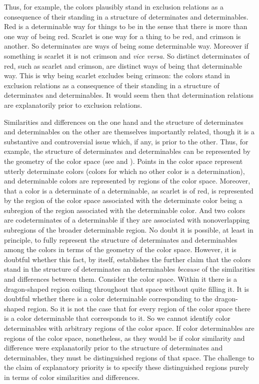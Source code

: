 \documentclass[12pt]{article}
\begin{document}
Thus, for example, the colors plausibly stand in exclusion relations as a consequence of their standing in a structure of determinates and determinables. Red is a determinable way for things to be in the sense that there is more than one way of being red. Scarlet is one way for a thing to be red, and crimson is another. So determinates are ways of being some determinable way. Moreover if something is scarlet it is not crimson and \emph{vice versa}. So distinct determinates of red, such as scarlet and crimson, are distinct ways of being that determinable way. This is why being scarlet excludes being crimson: the colors stand in exclusion relations as a consequence of their standing in a structure of determinates and determinables. It would seem then that determination relations are explanatorily prior to exclusion relations.

Similarities and differences on the one hand and the structure of determinates and determinables on the other are themselves importantly related, though it is a substantive and controversial issue which, if any, is prior to the other. Thus, for example, the structure of determinates and determinables can be represented by the geometry of the color space (see \citealt{Hilbert:2000on} and \citealt{Funkhouser:2006as}). Points in the color space represent utterly determinate colors (colors for which no other color is a determination), and determinable colors are represented by regions of the color space. Moreover, that a color is a determinate of a determinable, as scarlet is of red, is represented by the region of the color space associated with the determinate color being a subregion of the region associated with the determinable color. And two colors are codeterminates of a determinable if they are associated with nonoverlapping subregions of the broader determinable region. No doubt it is possible, at least in principle, to fully represent the structure of determinates and determinables among the colors in terms of the geometry of the color space. However, it is doubtful whether this fact, by itself, establishes the further claim that the colors stand in the structure of determinates an determinables \emph{because} of the similarities and differences between them. Consider the color space. Within it there is a dragon-shaped region coiling throughout that space without quite filling it. It is doubtful whether there is a color determinable corresponding to the dragon-shaped region. So it is not the case that for every region of the color space there is a color determinable that corresponds to it. So we cannot identify color determinables with arbitrary regions of the color space. If color determinables are regions of the color space, nonetheless, as they would be if color similarity and difference were explanatorily prior to the structure of determinates and determinables, they must be distinguished regions of that space. The challenge to the claim of explanatory priority is to specify these distinguished regions purely in terms of color similarities and differences. 
\end{document}
